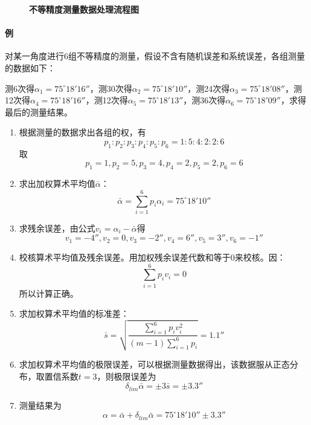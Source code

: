 \begin{figure}[H]
	\caption{\textbf{不等精度测量数据处理流程图}}
\end{figure}
\paragraph{例}对某一角度进行6组不等精度的测量，假设不含有随机误差和系统误差，各组测量的数据如下：

测6次得$ \alpha_1=75^\circ18'16'' $，测30次得$ \alpha_2=75^\circ18'10'' $，测24次得$ \alpha_3=75^\circ18'08'' $，测12次得$ \alpha_4=75^\circ18'16'' $，测12次得$ \alpha_5=75^\circ18'13'' $，测36次得$ \alpha_6=75^\circ18'09'' $，求得最后的测量结果。
\begin{enumerate}
	\item 根据测量的数据求出各组的权，有\begin{equation} p_1:p_2:p_3:p_4:p_5:p_6=1:5:4:2:2:6 \end{equation}取\begin{equation} p_1=1,p_2=5,p_3=4,p_4=2,p_5=2,p_6=6 \end{equation}
	\item 求出加权算术平均值$ \bar{\alpha} $：\begin{equation} \bar{\alpha}=\sum_{i=1}^{6}p_i\alpha_i=75^\circ18'10'' \end{equation}
	\item 求残余误差，由公式$ v_i=\alpha_i-\bar{\alpha} $得\begin{equation} v_1=-4'',v_2=0,v_3=-2'',v_4=6'',v_5=3'',v_6=-1'' \end{equation}
	\item 校核算术平均值及残余误差。用加权残余误差代数和等于0来校核。因：\begin{equation} \sum_{i=1}^{6}p_iv_i=0 \end{equation}所以计算正确。
	\item 求加权算术平均值的标准差：\begin{equation} \bar{s}=\sqrt{\frac{\sum\limits_{i=1}^{6}p_iv_i^2}{(m-1)\sum\limits_{i=1}^{6}p_i}}=1.1'' \end{equation}
	\item 求加权算术平均值的极限误差，可以根据测量数据得出，该数据服从正态分布，取置信系数$ t=3 $，则极限误差为\begin{equation} \delta_{lim}\bar{\alpha}=\pm3\bar{s}=\pm3.3'' \end{equation}
	\item 测量结果为\begin{equation} \alpha=\bar{\alpha}+\delta_{lim}\bar{\alpha}=75^\circ18'10''\pm3.3'' \end{equation}
\end{enumerate}
